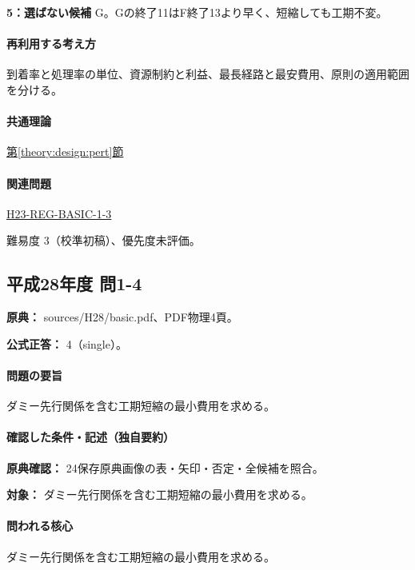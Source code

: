 \noindent\textbf{5：選ばない候補} G。Gの終了11はF終了13より早く、短縮しても工期不変。\par

\paragraph{再利用する考え方} 到着率と処理率の単位、資源制約と利益、最長経路と最安費用、原則の適用範囲を分ける。

\paragraph{共通理論} \hyperref[theory:design:pert]{第\ref*{theory:design:pert}節}

\paragraph{関連問題} \hyperref[q:h23-reg-basic-1-3]{H23-REG-BASIC-1-3}

\par 難易度 3（校準初稿）、優先度未評価。

\subsection{平成28年度 問1-4}
\label{q:h28-reg-basic-1-4}

\noindent\textbf{原典：} sources/H28/basic.pdf、PDF物理4頁。

\textbf{公式正答：} 4（single）。

\paragraph{問題の要旨} ダミー先行関係を含む工期短縮の最小費用を求める。

\paragraph{確認した条件・記述（独自要約）}\mbox{}\par

\noindent\textbf{原典確認：} 24保存原典画像の表・矢印・否定・全候補を照合。\par

\noindent\textbf{対象：} ダミー先行関係を含む工期短縮の最小費用を求める。\par

\paragraph{問われる核心} ダミー先行関係を含む工期短縮の最小費用を求める。

